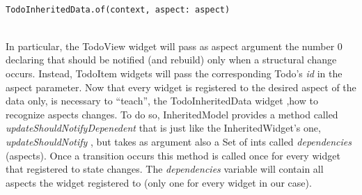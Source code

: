 \begin{code}
\label{code:2.47}
\begin{verbatim}

TodoInheritedData.of(context, aspect: aspect)
\end{verbatim}
\end{code}
\mbox{}\\
In particular, the TodoView widget will pass as aspect argument the number 0 declaring that should be notified (and rebuild) only when a structural change occurs.
Instead, TodoItem widgets will pass the corresponding Todo’s \textit{id} in the aspect parameter.
Now that every widget is registered to the desired aspect of the data only, is necessary to “teach”, the TodoInheritedData widget ,how to recognize aspects changes. To do so, InheritedModel provides a method called \textit{updateShouldNotifyDepenedent} that is just like the InheritedWidget’s one, \textit{updateShouldNotify }, but takes as argument also a Set of ints called \textit{dependencies }  (aspects). Once a transition occurs this method is called once for every widget that registered to state changes. The \textit{dependencies }  variable will contain all aspects the widget registered to (only one for every widget in our case). 
\mbox{}\\
